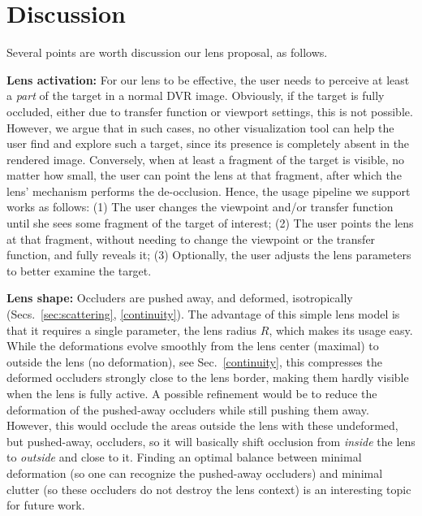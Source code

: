 \section{Discussion}
\label{sec:discussion}
%
%
Several points are worth discussion our lens proposal, as follows.

\vspace{0.15cm}
\noindent\textbf{Lens activation:} For our lens to be effective, the user needs to perceive at least a \emph{part} of the target in a normal DVR image. Obviously, if the target is fully occluded, either due to transfer function or viewport settings, this is not possible. However, we argue that in such cases, no other visualization tool can help the user find and explore such a target, since its presence is completely absent in the rendered image. Conversely, when at least a fragment of the target is visible, no matter how small, the user can point the lens at that fragment, after which the lens' mechanism performs the de-occlusion. Hence, the usage pipeline we support works as follows: (1) The user changes the viewpoint and/or transfer function until she sees some fragment of the target of interest; (2) The user points the lens at that fragment, without needing to change the viewpoint or the transfer function, and fully reveals it; (3) Optionally, the user adjusts the lens parameters to better examine the target.


\vspace{0.15cm}
\noindent\textbf{Lens shape:} Occluders are pushed away, and deformed, isotropically (Secs.~\ref{sec:scattering}, \ref{continuity}). The advantage of this simple lens model is that it requires a single parameter, the lens radius $R$, which makes its usage easy. While the deformations evolve smoothly from the lens center (maximal) to outside the lens (no deformation), see Sec.~\ref{continuity}, this compresses the deformed occluders strongly close to the lens border, making them hardly visible when the lens is fully active. A possible refinement would be to reduce the deformation of the pushed-away occluders while still pushing them away. However, this would occlude the areas outside the lens with these undeformed, but pushed-away, occluders, so it will basically shift occlusion from \emph{inside} the lens to \emph{outside} and close to it. Finding an optimal balance between minimal deformation (so one can recognize the pushed-away occluders) and minimal clutter (so these occluders do not destroy the lens context) is an interesting topic for future work.

